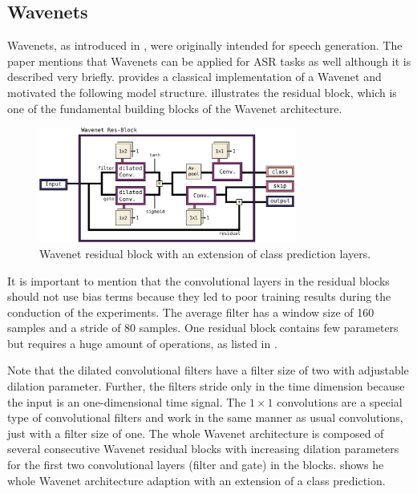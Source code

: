 \subsection{Wavenets}\label{sec:nn_arch_wavenet}
Wavenets, as introduced in \cite{Oord2016}, were originally intended for speech generation.
The paper mentions that Wavenets can be applied for ASR tasks as well although it is described very briefly.
\cite{Herrmann2018} provides a classical implementation of a Wavenet and motivated the following model structure.
 illustrates the residual block, which is one of the fundamental building blocks of the Wavenet architecture.
\begin{figure}[!ht]
  \centering
    \includegraphics[width=0.75\textwidth]{./4_nn/figs/nn_arch_wavenet_block.pdf}
  \caption{Wavenet residual block \cite{Oord2016} with an extension of class prediction layers.}
  \label{fig:nn_arch_wavenet_block}
\end{figure}
\FloatBarrier
\noindent
It is important to mention that the convolutional layers in the residual blocks should not use bias terms because they led to poor training results during the conduction of the experiments.
The average filter has a window size of 160 samples and a stride of 80 samples.
One residual block contains few parameters but requires a huge amount of operations, as listed in .

Note that the dilated convolutional filters have a filter size of two with adjustable dilation parameter.
Further, the filters stride only in the time dimension because the input is an one-dimensional time signal.
The $1 \times 1$ convolutions are a special type of convolutional filters and work in the same manner as usual convolutions, just with a filter size of one.
The whole Wavenet architecture is composed of several consecutive Wavenet residual blocks with increasing dilation parameters for the first two convolutional layers (filter and gate) in the blocks.
 shows he whole Wavenet architecture adaption with an extension of a class prediction.
